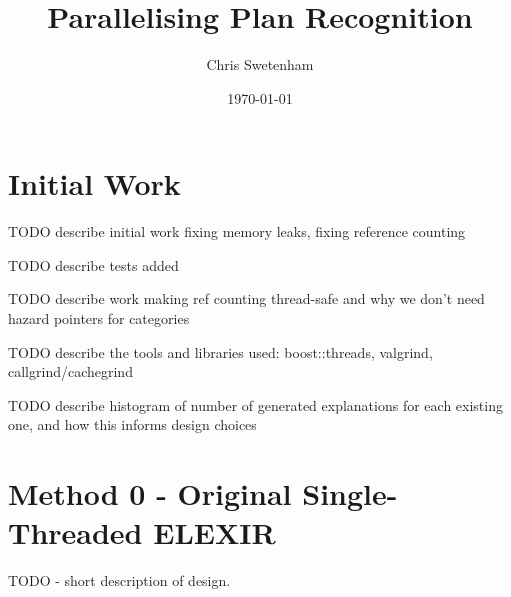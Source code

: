 \documentclass[12pt,twoside,abbrevs,msc,ai,notimes,logo,sansheadings]{infthesis}
\title{Parallelising Plan Recognition}
\author{Chris Swetenham}
\date{\today}
\begin{document}
  \begin{preliminary}
    \maketitle

    
    \standarddeclaration
    \tableofcontents
    \listoffigures
  \end{preliminary}


  
  
  
  
  \chapter{Initial Work}
  TODO describe initial work fixing memory leaks, fixing reference counting
  
  TODO describe tests added
  
  TODO describe work making ref counting thread-safe and why we don't need hazard pointers for categories
  
  TODO describe the tools and libraries used: boost::threads, valgrind, callgrind/cachegrind
  
  TODO describe histogram of number of generated explanations for each existing one, and how this informs design choices
  
  \chapter {Method 0 - Original Single-Threaded ELEXIR}
  TODO - short description of design.
\end{document}
